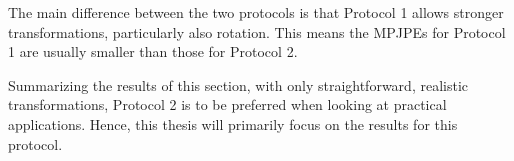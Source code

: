 The main difference between the two protocols is that Protocol 1 allows stronger transformations, particularly also rotation.
This means the MPJPEs for Protocol 1 are usually smaller than those for Protocol 2.

Summarizing the results of this section, with only straightforward, realistic transformations, Protocol 2 is to be preferred when looking at practical applications.
Hence, this thesis will primarily focus on the results for this protocol.